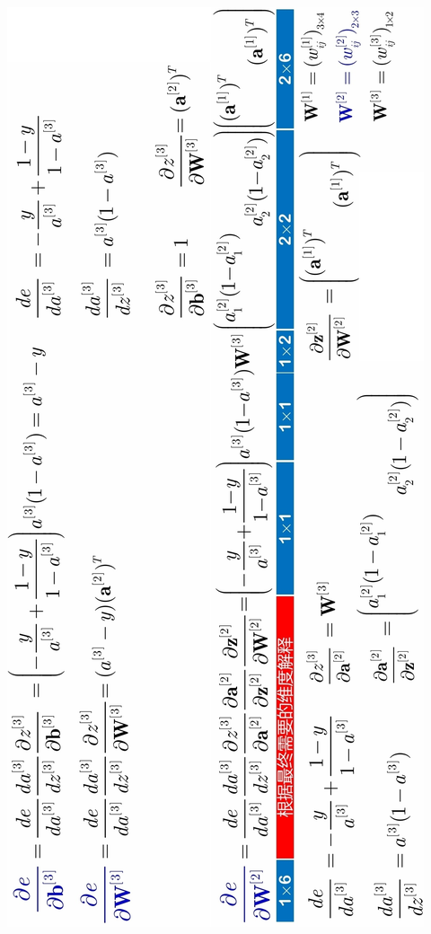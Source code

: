 	\begin{figurehere}
		\centering
		\includegraphics[width=0.85\linewidth]{image18}
		\label{fig:image18}
	\end{figurehere}
		
